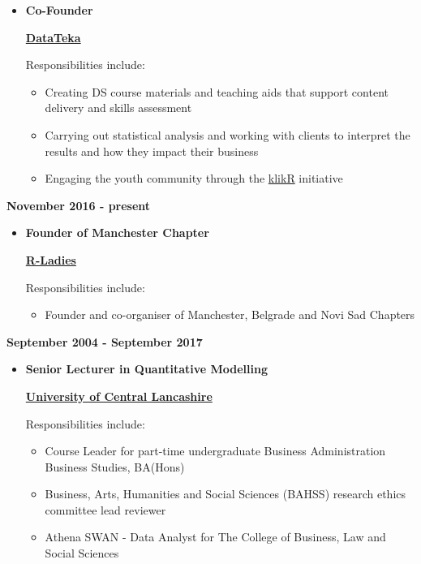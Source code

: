 \documentclass[
]{article}
\providecommand{\tightlist}{%
  \setlength{\itemsep}{0pt}\setlength{\parskip}{0pt}}
\begin{document}
\begin{itemize}
\item
  \textbf{Co-Founder}

  \href{https://www.datateka.com}{\textbf{DataTeka}}

  Responsibilities include:

  \begin{itemize}
  \tightlist
  \item
    Creating DS course materials and teaching aids that support content
    delivery and skills assessment
  \item
    Carrying out statistical analysis and working with clients to
    interpret the results and how they impact their business
  \item
    Engaging the youth community through the
    \href{http://klikr.rbind.io}{klikR} initiative
  \end{itemize}
\end{itemize}

\textbf{November 2016 - present}

\begin{itemize}
\item
  \textbf{Founder of Manchester Chapter}

  \href{https://rladies.org}{\textbf{R-Ladies}}

  Responsibilities include:

  \begin{itemize}
  \tightlist
  \item
    Founder and co-organiser of Manchester, Belgrade and Novi Sad
    Chapters
  \end{itemize}
\end{itemize}

\textbf{September 2004 - September 2017}

\begin{itemize}
\item
  \textbf{Senior Lecturer in Quantitative Modelling}

  \href{https://www.uclan.ac.uk}{\textbf{University of Central
  Lancashire}}

  Responsibilities include:

  \begin{itemize}
  \tightlist
  \item
    Course Leader for part-time undergraduate Business Administration
    Business Studies, BA(Hons)
  \item
    Business, Arts, Humanities and Social Sciences (BAHSS) research
    ethics committee lead reviewer
  \item
    Athena SWAN - Data Analyst for The College of Business, Law and
    Social Sciences
  \end{itemize}
\end{itemize}
\end{document}
